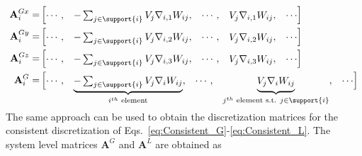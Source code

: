 \begin{align}\renewcommand{\arraystretch}{1.2}
\mathbf{A}^{Gx}_i=& \begin{bmatrix}
\cdots, & 
\smash[b]{\begin{matrix}-\sum_{j \in \support{i}} V_j \nabla_{i,1} W_{ij} \end{matrix} },
&\cdots, &\smash[b]{{\begin{matrix}V_j \nabla_{i,1} W_{ij}\end{matrix}}}, & \cdots
\end{bmatrix}\\
\mathbf{A}^{Gy}_i=& \begin{bmatrix}
\cdots, & 
\smash[b]{\begin{matrix}-\sum_{j \in \support{i}} V_j \nabla_{i,2} W_{ij} \end{matrix} },
&\cdots, &\smash[b]{{\begin{matrix}V_j \nabla_{i,2} W_{ij}\end{matrix}}}, & \cdots
\end{bmatrix}\\
\mathbf{A}^{Gz}_i=& \begin{bmatrix}
\cdots, & 
\smash[b]{\begin{matrix}-\sum_{j \in \support{i}} V_j \nabla_{i,3} W_{ij} \end{matrix} },
&\cdots, &\smash[b]{{\begin{matrix}V_j \nabla_{i,3} W_{ij}\end{matrix}}}, & \cdots
\end{bmatrix}\\
\mathbf{A}^{G}_i=& \begin{bmatrix}
\cdots, & 
\smash[b]{\underbrace{\begin{matrix}-\sum_{j \in \support{i}} V_j \nabla_i W_{ij} \end{matrix}}_{i^{th}\text{ element} }} ,
&\cdots, &\smash[b]{\underbrace{\begin{matrix}V_j \nabla_i W_{ij}\end{matrix}}_{j^{th}\text{ element s.t. }{j \in \support{i}} }}, & \cdots
\end{bmatrix}\label{eq:AGMat}
\end{align}
\\
The same approach can be used to obtain the discretization matrices for the consistent discretization of Eqs.~\ref{eq:Consistent_G}-\ref{eq:Consistent_L}. The system level matrices $\mathbf{A}^G$ and $\mathbf{A}^L$ are obtained as

